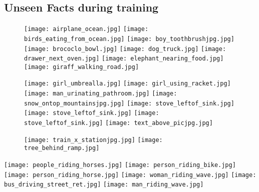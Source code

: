 \documentclass[runningheads]{llncs}
\begin{document}
\subsection{Unseen Facts during training}\begin{figure}[h!]
  \centering
    \texttt{[image: airplane\_ocean.jpg]}
   \texttt{[image: birds\_eating\_from\_ocean.jpg]}
     \texttt{[image: boy\_toothbrushjpg.jpg]}
   \texttt{[image: brococlo\_bowl.jpg]}  \texttt{[image: dog\_truck.jpg]}
   \texttt{[image: drawer\_next\_oven.jpg]}  \texttt{[image: elephant\_nearing\_food.jpg]}
   \texttt{[image: giraff\_walking\_road.jpg]}
   \end{figure}\begin{figure}[h!]
    \texttt{[image: girl\_umbrealla.jpg]}
   \texttt{[image: girl\_using\_racket.jpg]}  \texttt{[image: man\_urinating\_pathroom.jpg]}
   \texttt{[image: snow\_ontop\_mountainsjpg.jpg]}
      \texttt{[image: stove\_leftof\_sink.jpg]}
            \texttt{[image: stove\_leftof\_sink.jpg]}      \texttt{[image: stove\_leftof\_sink.jpg]}      \texttt{[image: text\_above\_picjpg.jpg]}
            \end{figure}\begin{figure}[h!]
             \texttt{[image: train\_x\_stationjpg.jpg]}      \texttt{[image: tree\_behind\_ramp.jpg]}
\end{figure}%
  \centering
    \texttt{[image: people\_riding\_horses.jpg]}
   \texttt{[image: person\_riding\_bike.jpg]}
     \texttt{[image: person\_riding\_horse.jpg]}
   \texttt{[image: woman\_riding\_wave.jpg]}
         \texttt{[image: bus\_driving\_street\_ret.jpg]}  \texttt{[image: man\_riding\_wave.jpg]}
\end{document}
